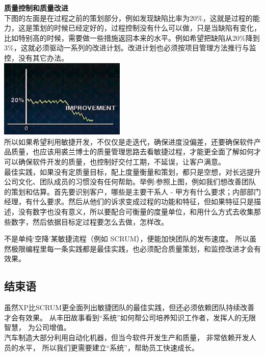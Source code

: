 \textbf{质量控制和质量改进}\\
下图的左面是在过程之前的策划部分，例如发现缺陷比率为20\%，这就是过程的能力，这是策划的时候已经定好的，过程控制没有什么可以做，只是当缺陷有变化，比如特别高的时候，需要做一些措施返回本来的水平。例如希望把缺陷从20\%降到3\%，这就必须驱动一系列的改进计划。改进计划也必须按项目管理方法推行与监控，没有其它办法。\\

\includegraphics[width=6cm]{JuranImprovementScreenshot_2022-10-23_211444.jpg}\\

所以如果希望利用敏捷开发，不仅仅是走迭代，确保进度没偏差，还要确保软件产品质量，也应该用裘兰博士的质量管理思路去看敏捷过程，才能更全面了解如何才可以确保软件开发的质量，也控制好交付工期，不延误，让客户满意。\\
最佳实践，如果没有定质量目标，配上度量衡量和策划，都只是空想，对长远提升公司文化、团队成员的习惯没有任何帮助。举例:参照上图，例如我们想改善团队的策划和估算。首先要识别客户，哪些是主要干系人
-
甲方有什么要求；内部部门经理，有什么要求。然后从他们的诉求变成过程的功能和特征，但如果特征只是描述，没有数字也没有意义，所以要配合可衡量的度量单位，和用什么方式去收集那些数字，然后依据目标定过程要怎么去做，怎样改。

不是单纯`空降'某敏捷流程（例如 SCRUM），便能加快团队的发布速度。
所以虽然极限编程里每一条实践都是最佳实践，也必须配合质量策划，和监控改进才会有效果。

\hypertarget{ux7ed3ux675fux8bed}{%
\subsection{结束语}\label{ux7ed3ux675fux8bed}}

虽然XP比SCRUM更全面列出敏捷团队的最佳实践，但还必须依赖团队持续改善才会有效果。
从丰田故事看到``系统''如何帮公司培养知识工作者，发挥人的无限智慧，
为公司增值。\\
汽车制造大部分利用自动化机器，但当今软件开发生产和质量，
非常依赖开发人员的水平， 所以我们更需要建立``系统''，帮助员工快速成长。

